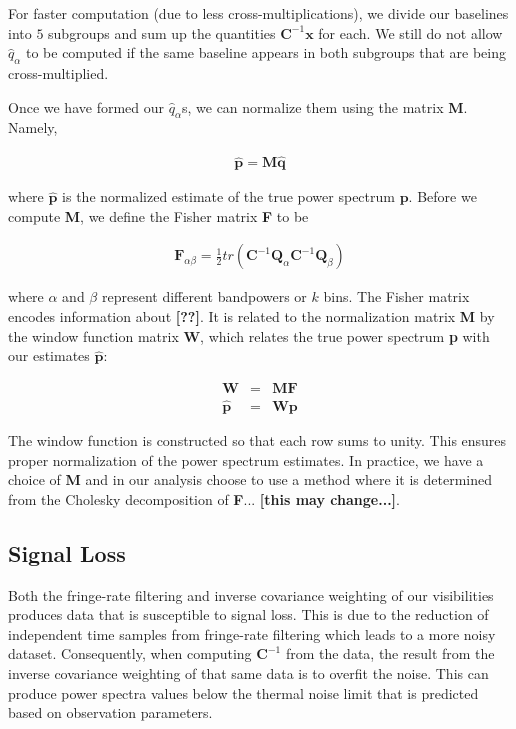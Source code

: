 \documentclass[preprint2,numberedappendix,tighten,twocolappendix]{aastex6}  %
\newcommand{\cc}[1]{{\color{purple} \textbf{[#1]}}}
\begin{document}
For faster computation (due to less cross-multiplications), we divide our baselines into $5$ subgroups and sum up the quantities $\textbf{C}^{-1}\textbf{x}$ for each. We still do not allow $\hat{q}_{\alpha}$ to be computed if the same baseline appears in both subgroups that are being cross-multiplied. 

Once we have formed our $\hat{q}_{\alpha}$s, we can normalize them using the matrix \textbf{M}. Namely,

\begin{eqnarray}
\hat{\textbf{p}} = \textbf{M}\hat{\textbf{q}}
\end{eqnarray}

\noindent where $\hat{\textbf{p}}$ is the normalized estimate of the true power spectrum $\textbf{p}$. Before we compute \textbf{M}, we define the Fisher matrix \textbf{F} to be

\begin{eqnarray}
\textbf{F}_{\alpha\beta} = \frac{1}{2}tr(\textbf{C}^{-1}\textbf{Q}_{\alpha}\textbf{C}^{-1}\textbf{Q}_{\beta})
\end{eqnarray}

\noindent where $\alpha$ and $\beta$ represent different bandpowers or $k$ bins. The Fisher matrix encodes information about \cc{??}. It is related to the normalization matrix \textbf{M} by the window function matrix \textbf{W}, which relates the true power spectrum \textbf{p} with our estimates $\hat{\textbf{p}}$:

\begin{eqnarray}
\textbf{W} &=& \textbf{MF} \\
\hat{\textbf{p}} &=& \textbf{Wp}
\end{eqnarray}

\noindent The window function is constructed so that each row sums to unity. This ensures proper normalization of the power spectrum estimates. In practice, we have a choice of \textbf{M} and in our analysis choose to use a method where it is determined from the Cholesky decomposition of \textbf{F}... \cc{this may change...}. 

\subsection{Signal Loss}
\label{sec:Sigloss}

Both the fringe-rate filtering and inverse covariance weighting of our visibilities produces data that is susceptible to signal loss. This is due to the reduction of independent time samples from fringe-rate filtering which leads to a more noisy dataset. Consequently, when computing $\textbf{C}^{-1}$ from the data, the result from the inverse covariance weighting of that same data is to overfit the noise. This can produce power spectra values below the thermal noise limit that is predicted based on observation parameters. 
\end{document}
